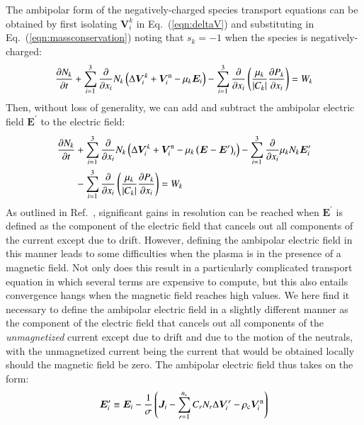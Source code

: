 \documentclass{warpdoc}
\newcommand{\alb}{\vspace{0.1cm}\\} %
\newcommand{\mfd}{\displaystyle}
\newcommand{\ns}{{n_{\rm s}}}
\renewcommand{\vec}[1]{\bm{#1}}
\begin{document}
The ambipolar form of the negatively-charged species transport equations can be obtained by first isolating $\vec{V}_i^k$ in  Eq.\ (\ref{eqn:deltaV}) and substituting in Eq.\ (\ref{eqn:massconservation}) noting that $s_k=-1$ when the species is negatively-charged:
%
\begin{equation}
\begin{array}{l}\mfd
  \frac{\partial N_k}{\partial t} 
+ \sum_{i=1}^3 \frac{\partial}{\partial x_i}  N_k \left(  \Delta \vec{V}_i^k +\vec{V}^{\rm n}_i - \mu_k  \vec{E}_i
\right) 
- \sum_{i=1}^3  \frac{\partial}{\partial x_i}  \left( 
   \frac{\mu_k }{|C_k|} \frac{\partial P_k}{\partial x_i}
\right) 
= W_k
\end{array}
\end{equation}
%
Then, without loss of generality, we can add and subtract the ambipolar electric field $\vec{E}^\prime$ to the electric field:
%
\begin{align}
  \frac{\partial N_k}{\partial t} 
&+ \sum_{i=1}^3 \frac{\partial}{\partial x_i}  N_k \left(  \Delta \vec{V}_i^k +\vec{V}^{\rm n}_i - \mu_k  \left(\vec{E} -\vec{E}^\prime  \right)_i
\right) 
- \sum_{i=1}^3  \frac{\partial}{\partial x_i}  \mu_k N_k \vec{E}^\prime_i \nonumber\alb
&- \sum_{i=1}^3  \frac{\partial}{\partial x_i}  \left( 
   \frac{\mu_k }{|C_k|} \frac{\partial P_k}{\partial x_i}
\right) 
= W_k
\label{eqn:negspecies1}
\end{align}
%
As outlined in Ref.\ \cite{jcp:2014:parent}, significant gains in resolution can be reached when $\vec{E}^\prime$ is defined as the component of the electric field that cancels out all components of the current except due to drift. However, defining the ambipolar electric field  in this manner leads to some difficulties when the plasma is in the presence of a magnetic field. Not only does this result in a particularly complicated transport equation in which several terms are expensive to compute, but this  also entails convergence hangs when the magnetic field reaches high values. We here find it necessary to define the ambipolar electric field in a slightly different manner as the component of the electric field that cancels out all components of the \emph{unmagnetized} current except due to drift and due to the motion of the neutrals, with the unmagnetized current being the current that would be obtained locally should the magnetic field be zero. The ambipolar electric field thus takes on the form:
%
\begin{equation}
 \vec{E}_i^\prime \equiv \vec{E}_i - \frac{1}{\sigma} \left(\vec{J}_i-\sum_{r=1}^\ns C_r N_r \Delta \vec{V}_i^r -\rho_{\rm c} \vec{V}_i^{\rm n} \right)
 \label{eqn:Eprimedefinition}
\end{equation}
\end{document}
